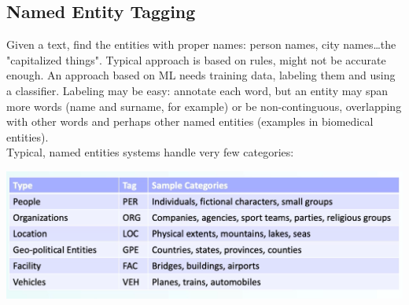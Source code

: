 \documentclass[10pt]{report}
\begin{document}
\subsection{Named Entity Tagging}
Given a text, find the entities with proper names: person names, city names\ldots the "capitalized things". Typical approach is based on rules, might not be accurate enough. An approach based on ML needs training data, labeling them and using a classifier. Labeling may be easy: annotate each word, but an entity may span more words (name and surname, for example) or be non-continguous, overlapping with other words and perhaps other named entities (examples in biomedical entities).\\
Typical, named entities systems handle very few categories:
\begin{center}
	\includegraphics[scale=0.33]{20.png}
\end{center}
\end{document}
